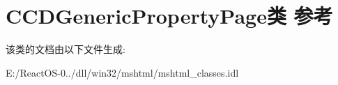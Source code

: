 \hypertarget{class_c_c_d_generic_property_page}{}\section{C\+C\+D\+Generic\+Property\+Page类 参考}
\label{class_c_c_d_generic_property_page}


该类的文档由以下文件生成\+:\begin{DoxyCompactItemize}
\item 
E\+:/\+React\+O\+S-\/0../dll/win32/mshtml/mshtml\+\_\+classes.\+idl\end{DoxyCompactItemize}
